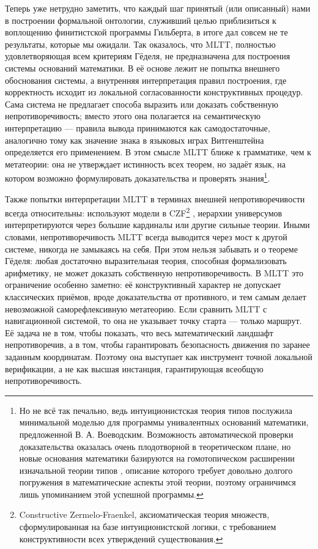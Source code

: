 \documentclass[14pt]{extarticle}
\begin{document}
	Теперь уже нетрудно заметить, что каждый шаг принятый (или описанный) нами в построении формальной онтологии, служивший целью приблизиться к воплощению финитистской программы Гильберта, в итоге дал совсем не те результаты, которые мы ожидали. Так оказалось, что MLTT, полностью удовлетворяющая всем критериям Гёделя, не предназначена для построения системы оснований математики. В её основе лежит не попытка внешнего обоснования системы, а внутренняя интерпретация правил построения, где корректность исходит из локальной согласованности конструктивных процедур. Сама система не предлагает способа выразить или доказать собственную непротиворечивость; вместо этого она полагается на семантическую интерпретацию — правила вывода принимаются как самодостаточные, аналогично тому как значение знака в языковых играх Витгенштейна определяется его применением. В этом смысле MLTT ближе к грамматике, чем к метатеории: она не утверждает истинность всех теорем, но задаёт язык, на котором возможно формулировать доказательства и проверять знания\footnote{Но не всё так печально, ведь интуиционистская теория типов послужила минимальной моделью для программы унивалентных оснований математики, предложенной В.  А. Воеводским. Возможность автоматической проверки доказательства оказалась очень плодотворной в теоретическом плане, но новые основания математики базируются на гомотопическом расширении изначальной теории типов \cite[90]{HoTTBook2013}, описание которого требует довольно долгого погружения в математические аспекты этой теории, поэтому ограничимся лишь упоминанием этой успешной программы.}.
	
	Также попытки интерпретации MLTT в терминах внешней непротиворечивости всегда относительны: используют модели в CZF\footnote{Constructive Zermelo-Fraenkel, аксиоматическая теория множеств, сформулированная на базе интуиционистской логики, с требованием конструктивности всех утверждений существования.} \cite{aczel1978typetheoretic}, иерархии универсумов интерпретируются через большие кардиналы или другие сильные теории. Иными словами, непротиворечивость MLTT всегда выводится через мост к другой системе, никогда не замыкаясь на себя. При этом нельзя забывать и о теореме Гёделя: любая достаточно выразительная теория, способная формализовать арифметику, не может доказать собственную непротиворечивость. В MLTT это ограничение особенно заметно: её конструктивный характер не допускает классических приёмов, вроде доказательства от противного, и тем самым делает невозможной саморефлексивную метатеорию. Если сравнить MLTT с навигационной системой, то она не указывает точку старта — только маршрут. Её задача не в том, чтобы показать, что весь математический ландшафт непротиворечив, а в том, чтобы гарантировать безопасность движения по заранее заданным координатам. Поэтому она выступает как инструмент точной локальной верификации, а не как высшая инстанция, гарантирующая всеобщую непротиворечивость.
	
\end{document}
